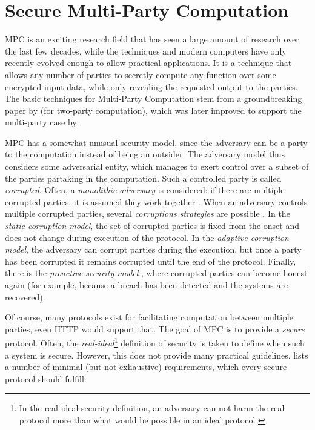 \section{Secure Multi-Party Computation}
\label{sec:mpc}
\gls{MPC} is an exciting research field that has seen a large amount of research over the last few decades, while the techniques and modern computers have only recently evolved enough to allow practical applications. It is a technique that allows any number of parties to secretly compute any function over some encrypted input data, while only revealing the requested output to the parties. The basic techniques for Multi-Party Computation stem from a groundbreaking paper by \citet{yao} (for two-party computation), which was later improved to support the multi-party case by \citet{mpc}.

\gls{MPC} has a somewhat unusual security model, since the adversary can be a party to the computation instead of being an outsider. The adversary model thus considers some adversarial entity, which manages to exert control over a subset of the parties partaking in the computation. Such a controlled party is called \textit{corrupted}. Often, a \textit{monolithic adversary} is considered: if there are multiple corrupted parties, it is assumed they work together \citep{mpc-good-practice}. When an adversary controls multiple corrupted parties, several \textit{corruptions strategies} are possible \citep{secure-mpc}. In the \textit{static corruption model}, the set of corrupted parties is fixed from the onset and does not change during execution of the protocol. In the \textit{adaptive corruption model}, the adversary can corrupt parties during the execution, but once a party has been corrupted it remains corrupted until the end of the protocol. Finally, there is the \textit{proactive security model} \citep{sec-transient-failures}, where corrupted parties can become honest again (for example, because a breach has been detected and the systems are recovered).

Of course, many protocols exist for facilitating computation between multiple parties, even HTTP would support that. The goal of \gls{MPC} is to provide a \textit{secure} protocol. Often, the \textit{real-ideal}\footnote{In the real-ideal security definition, an adversary can not harm the real protocol more than what would be possible in an ideal protocol \citep{mpc}} definition of security is taken to define when such a system is secure. However, this does not provide many practical guidelines. \citet{secure-mpc} lists a number of minimal (but not exhaustive) requirements, which every secure protocol should fulfill:

